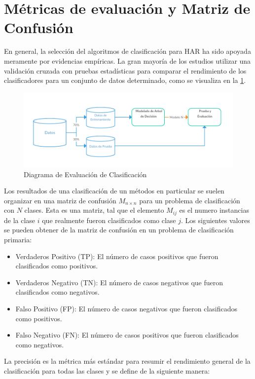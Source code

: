 \section{Métricas de evaluación y Matriz de Confusión}
En general, la selección del algoritmos de clasificación para HAR ha sido apoyada meramente por evidencias empíricas. La gran mayoría de los estudios utilizar una validación cruzada con pruebas estadísticas para comparar el rendimiento de los clasificadores para un conjunto de datos determinado, como se visualiza en la \ref{fig:evaluacion}.

\begin{figure}[!htbp]
	\centering
	\includegraphics[width=0.7\linewidth]{capitulo-3/graphics/training-test}
	\caption[Diagrama de Evaluación de Clasificación]{Diagrama de Evaluación de Clasificación}
	\label{fig:evaluacion}
\end{figure}
	
Los resultados de una clasificación de un métodos en particular se suelen organizar en una matriz de confusión $M_{n \times n}$ para un problema de  clasificación con $N$ clases.
Esta es una matriz, tal que el elemento $M_{ij}$ es el numero instancias de la clase $i$ que realmente fueron clasificados como clase $j$.
Los siguientes valores se pueden obtener de la matriz de confusión en un problema de clasificación primaria:

\begin{itemize}
	\item Verdaderos Positivo (TP): El número de casos positivos que fueron clasificados como positivos.
	\item Verdaderos Negativo (TN): El número de casos negativos que fueron clasificados como negativos.
	\item Falso Positivo (FP): El número de casos negativos que fueron clasificados como positivos.
	\item Falso Negativo (FN): El número de casos positivos que fueron clasificados como negativos.
\end{itemize}

La precisión es la métrica más estándar para resumir el rendimiento general de la clasificación para todas las clases y se define de la siguiente manera:

